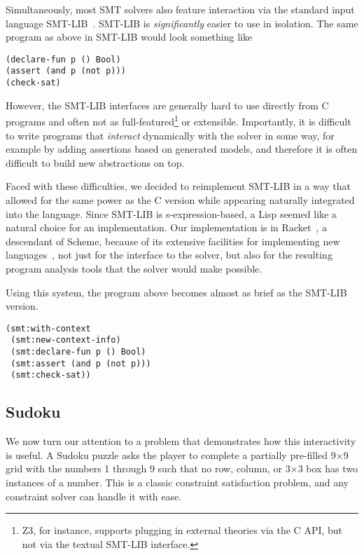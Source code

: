 Simultaneously, most SMT solvers also feature interaction via the standard input
language SMT-LIB~\cite{smtlib2:10}. SMT-LIB is \textit{significantly} easier to
use in isolation. The same program as above in SMT-LIB would look something like

\begin{verbatim}
(declare-fun p () Bool)
(assert (and p (not p)))
(check-sat)
\end{verbatim}

However, the SMT-LIB interfaces are generally hard to use directly from C
programs and often not as full-featured\footnote{Z3, for instance, supports
  plugging in external theories via the C API, but not via the textual SMT-LIB
  interface.}  or extensible. Importantly, it is difficult to write programs
that \textit{interact} dynamically with the solver in some way, for example by
adding assertions based on generated models, and therefore it is often difficult
to build new abstractions on top.

Faced with these difficulties, we decided to reimplement SMT-LIB in a way that
allowed for the same power as the C version while appearing naturally integrated
into the language. Since SMT-LIB is s-expression-based, a Lisp seemed like a
natural choice for an implementation. Our implementation is in
Racket~\cite{racket}, a descendant of Scheme, because of its extensive
facilities for implementing new languages~\cite{Tobin-Hochstadt:11}, not just
for the interface to the solver, but also for the resulting program analysis
tools that the solver would make possible.

Using this system, the program above becomes almost as brief as the SMT-LIB
version.

\begin{verbatim}
(smt:with-context
 (smt:new-context-info)
 (smt:declare-fun p () Bool)
 (smt:assert (and p (not p)))
 (smt:check-sat))
\end{verbatim}

\subsection{Sudoku}

We now turn our attention to a problem that demonstrates how this interactivity
is useful. A Sudoku puzzle asks the player to complete a partially pre-filled
9$\times$9 grid with the numbers 1 through 9 such that no row, column, or
3$\times$3 box has two instances of a number. This is a classic constraint
satisfaction problem, and any constraint solver can handle it with ease.

